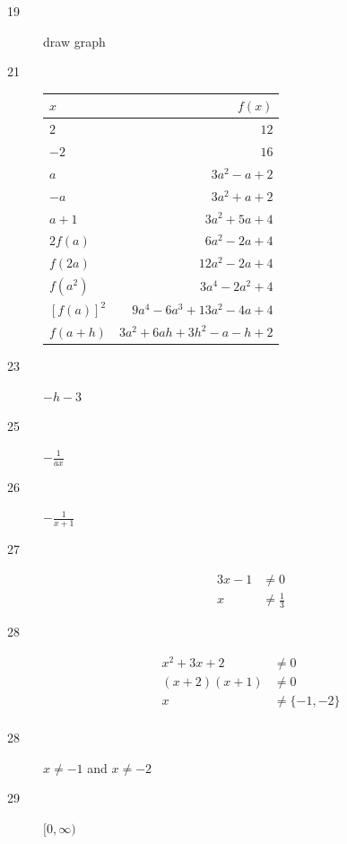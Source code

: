 \documentclass[letterpaper, landscape]{exam}
\begin{document}
\begin{description}
      \item[19] draw graph

      \item[21]
        \begin{tabular}[H]{lr}
          \toprule
          $x$ & $f(x)$ \\
          \midrule
          $2$          & $12$ \\
          $-2$         & $16$ \\
          $a$          & $3a^2 - a + 2$ \\
          $-a$         & $3a^2 + a + 2$ \\
          $a + 1$      & $3a^2 + 5a + 4$ \\
          $2 f(a)$     & $6a^2 - 2a + 4$ \\
          $f(2a)$      & $12a^2 - 2a + 4$ \\
          $f(a^2)$     & $3a^4 - 2a^2 + 4$ \\
          $[ f(a) ]^2$ & $9a^4 - 6a^3 + 13a^2 - 4a +  4$ \\
          $f(a + h)$   & $3a^2 + 6ah + 3h^2 - a - h + 2$ \\
        \end{tabular}

      \item[23] $-h - 3$

      \item[25] $-\frac{1}{a x}$

      \item[26] $-\frac{1}{x+1}$

      \item[27]
        \begin{align*}
          3x - 1 & \neq 0 \\
          x      & \neq \frac{1}{3}
        \end{align*}

      \item[28]
        \begin{align*}
          x^2 + 3x + 2    & \neq 0 \\
          (x + 2) (x + 1) & \neq 0 \\
          x               & \neq \{-1, -2\} \\
        \end{align*}

      \item[28] $x \neq -1$ and $x \neq -2$

      \item[29] $[0, \infty)$


\end{description}
\end{document}
